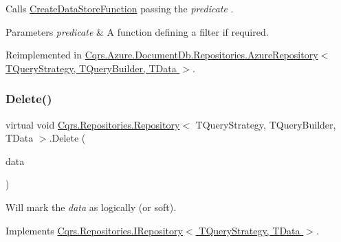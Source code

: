 Calls \hyperlink{classCqrs_1_1Repositories_1_1Repository_ae15cee6394a223564ad2ead65cd30189_ae15cee6394a223564ad2ead65cd30189}{Create\+Data\+Store\+Function} passing the {\itshape predicate} . 


\begin{DoxyParams}{Parameters}
{\em predicate} & A function defining a filter if required.\\
\hline
\end{DoxyParams}


Reimplemented in \hyperlink{classCqrs_1_1Azure_1_1DocumentDb_1_1Repositories_1_1AzureRepository_ac9ceeed80a02ced9a45b3443cd1f453f_ac9ceeed80a02ced9a45b3443cd1f453f}{Cqrs.\+Azure.\+Document\+Db.\+Repositories.\+Azure\+Repository$<$ T\+Query\+Strategy, T\+Query\+Builder, T\+Data $>$}.

\mbox{\label{classCqrs_1_1Repositories_1_1Repository_ac9d88baa6afcea85553fd233ba406e48_ac9d88baa6afcea85553fd233ba406e48}} 
\subsubsection{\texorpdfstring{Delete()}{Delete()}}
{\footnotesize\ttfamily virtual void \hyperlink{classCqrs_1_1Repositories_1_1Repository}{Cqrs.\+Repositories.\+Repository}$<$ T\+Query\+Strategy, T\+Query\+Builder, T\+Data $>$.Delete (\begin{DoxyParamCaption}\item[{T\+Data}]{data }\end{DoxyParamCaption})\hspace{0.3cm}{\ttfamily [virtual]}}



Will mark the {\itshape data}  as logically (or soft). 



Implements \hyperlink{interfaceCqrs_1_1Repositories_1_1IRepository_a71c60de3588a757da2d25350c98374fd_a71c60de3588a757da2d25350c98374fd}{Cqrs.\+Repositories.\+I\+Repository$<$ T\+Query\+Strategy, T\+Data $>$}.

\mbox{\label{classCqrs_1_1Repositories_1_1Repository_a6b6b50d476a351fc7fbd194cb8fa44d0_a6b6b50d476a351fc7fbd194cb8fa44d0}} 
